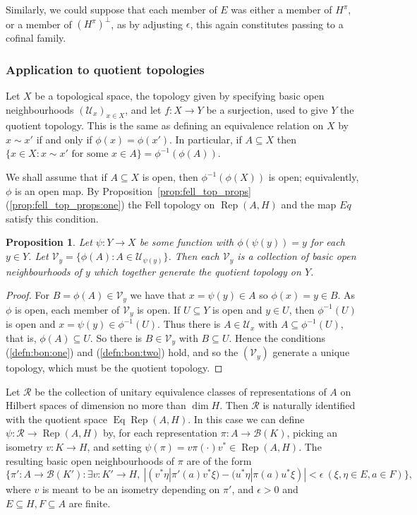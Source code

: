 \documentclass[a4paper,11pt]{article}
\newcommand{\mc}[1]{{\mathcal{#1}}}
\newcommand{\Rep}{\operatorname{Rep}}
\newcommand{\Eq}{\operatorname{Eq}}
\newtheorem{proposition}[lemma]{Proposition}
\begin{document}
Similarly, we could suppose that each member of $E$ was either a member of
$H^\pi$, or a member of $(H^\pi)^\perp$, as by adjusting $\epsilon$, this again
constitutes passing to a cofinal family.


\subsubsection{Application to quotient topologies}

Let $X$ be a topological space, the topology given by specifying basic open
neighbourhoods $(\mc U_x)_{x\in X}$, and let $f:X\rightarrow Y$ be a surjection,
used to give $Y$ the quotient topology.  This is the same as defining an
equivalence relation on $X$ by $x\sim x'$ if and only if $\phi(x)=\phi(x')$.
In particular, if $A\subseteq X$ then $\{x\in X : x\sim x' \text{ for some }
x\in A\} = \phi^{-1}(\phi(A))$.

We shall assume that if $A\subseteq X$ is open, then $\phi^{-1}(\phi(X))$ is
open; equivalently, $\phi$ is an open map.  By
Proposition~\ref{prop:fell_top_props}(\ref{prop:fell_top_props:one}) the Fell
topology on $\Rep(A,H)$ and the map $Eq$ satisfy this condition.

\begin{proposition}
Let $\psi:Y\rightarrow X$ be some function with $\phi(\psi(y))=y$ for each
$y\in Y$.  Let $\mc V_y = \{ \phi(A) : A\in\mc U_{\psi(y)}\}$.  Then each
$\mc V_y$ is a collection of basic open neighbourhoods of $y$ which together
generate the quotient topology on $Y$.
\end{proposition}
\begin{proof}
For $B=\phi(A)\in\mc V_y$ we have that $x=\psi(y)\in A$ so $\phi(x) = y
\in B$.  As $\phi$ is open, each member of $\mc V_y$ is open.  If $U\subseteq Y$
is open and $y\in U$, then $\phi^{-1}(U)$ is open and $x=\psi(y)\in
\phi^{-1}(U)$.  Thus there is $A\in\mc U_x$ with $A\subseteq\phi^{-1}(U)$, that
is, $\phi(A)\subseteq U$.  So there is $B\in\mc V_y$ with $B\subseteq U$.
Hence the conditions (\ref{defn:bon:one}) and (\ref{defn:bon:two}) hold, and
so the $(\mc V_y)$ generate a unique topology, which must be the quotient
topology.
\end{proof}

Let $\mc R$ be the collection of unitary equivalence classes of representations
of $A$ on Hilbert spaces of dimension no more than $\dim H$.  Then $\mc R$ is
naturally identified with the quotient space $\Eq\Rep(A,H)$.  In this case we
can define $\psi:\mc R\rightarrow\Rep(A,H)$ by, for each representation
$\pi:A\rightarrow\mc B(K)$, picking an isometry $v:K\rightarrow H$, and setting
$\psi(\pi) = v\pi(\cdot)v^* \in\Rep(A,H)$.  The resulting basic open
neighbourhoods of $\pi$ are of the form
\[ \big\{ \pi':A\rightarrow\mc B(K') : \exists v:K'\rightarrow H, \
|(v^*\eta|\pi'(a)v^*\xi) - (u^*\eta|\pi(a)u^*\xi)|<\epsilon \ (\xi,\eta\in E,
a\in F) \big\}, \]
where $v$ is meant to be an isometry depending on $\pi'$, and $\epsilon>0$
and $E\subseteq H,F\subseteq A$ are finite.
\end{document}
